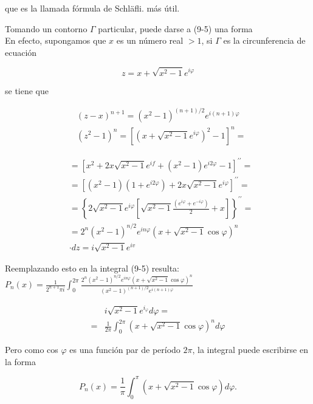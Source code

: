 \documentclass[10pt]{article}
\theoremstyle{plain}
\theoremstyle{definition}
\theoremstyle{remark}
\begin{document}
que es la llamada fórmula de Schläfli. más útil.

Tomando un contorno $\Gamma$ particular, puede darse a (9-5) una forma\\
En efecto, supongamos que $x$ es un número real $>1$, si $\Gamma$ es la circunferencia de ecuación

$$
z=x+\sqrt{x^{2}-1} e^{i \varphi}
$$

se tiene que

$$
\begin{aligned}
& (z-x)^{n+1}=\left(x^{2}-1\right)^{(n+1) / 2} e^{i(n+1) \varphi} \\
& \left(z^{2}-1\right)^{n}=\left[\left(x+\sqrt{x^{2}-1} e^{i \varphi}\right)^{2}-1\right]^{n}=
\end{aligned}
$$

$$
\begin{aligned}
& =\left[x^{2}+2 x \sqrt{x^{2}-1} e^{i f}+\left(x^{2}-1\right) e^{i 2 \varphi}-1\right]^{\prime \prime}= \\
& =\left[\left(x^{2}-1\right)\left(1+e^{i 2 \varphi}\right)+2 x \sqrt{x^{2}-1} e^{i \varphi}\right]^{\prime \prime}= \\
& =\left\{2 \sqrt{x^{2}-1} e^{i \varphi}\left[\sqrt{x^{2}-1} \frac{\left(e^{i \varphi}+e^{-i \varphi}\right)}{2}+x\right]\right\}^{\prime \prime}= \\
& =2^{n}\left(x^{2}-1\right)^{n / 2} e^{i n \varphi}\left(x+\sqrt{x^{2}-1} \cos \varphi\right)^{n} \\
& \cdot d z=i \sqrt{x^{2}-1} e^{i v}
\end{aligned}
$$

Reemplazando esto en la integral (9-5) resulta:\\
$P_{n}(x)=\frac{1}{2^{n+1} \pi i} \int_{0}^{2 \pi} \frac{2^{n}\left(x^{2}-1\right)^{n / 2} e^{i n \varphi}\left(x+\sqrt{x^{2}-1} \cos \varphi\right)^{n}}{\left(x^{2}-1\right)^{(n+1) / 2} e^{i(n+1) \varphi}}$

$$
\begin{aligned}
& i \sqrt{x^{2}-1} e^{i_{\varphi}} d \varphi= \\
= & \frac{1}{2 \pi} \int_{0}^{2 \pi}\left(x+\sqrt{x^{2}-1} \cos \varphi\right)^{n} d \varphi
\end{aligned}
$$

Pero como cos $\varphi$ es una función par de período $2 \pi$, la integral puede escribirse en la forma


\begin{equation*}
P_{n}(x)=\frac{1}{\pi} \int_{0}^{\pi}\left(x+\sqrt{x^{2}-1} \cos \varphi\right) d \varphi . \tag{9-6}
\end{equation*}
\end{document}
